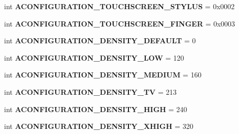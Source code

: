 \begin{DoxyCompactItemize}
int {\bfseries A\+C\+O\+N\+F\+I\+G\+U\+R\+A\+T\+I\+O\+N\+\_\+\+T\+O\+U\+C\+H\+S\+C\+R\+E\+E\+N\+\_\+\+S\+T\+Y\+L\+US} = 0x0002
\item 
\mbox{\label{classarsc_1_1external_1_1configuration_1_1AConfiguration_a693cd5bcf845730db0d1a15df39c61bb}} 
int {\bfseries A\+C\+O\+N\+F\+I\+G\+U\+R\+A\+T\+I\+O\+N\+\_\+\+T\+O\+U\+C\+H\+S\+C\+R\+E\+E\+N\+\_\+\+F\+I\+N\+G\+ER} = 0x0003
\item 
\mbox{\label{classarsc_1_1external_1_1configuration_1_1AConfiguration_a95cef07ba739b109cf6c2b8665bab27f}} 
int {\bfseries A\+C\+O\+N\+F\+I\+G\+U\+R\+A\+T\+I\+O\+N\+\_\+\+D\+E\+N\+S\+I\+T\+Y\+\_\+\+D\+E\+F\+A\+U\+LT} = 0
\item 
\mbox{\label{classarsc_1_1external_1_1configuration_1_1AConfiguration_a8ac42547b7b2555ca20491807ee42c31}} 
int {\bfseries A\+C\+O\+N\+F\+I\+G\+U\+R\+A\+T\+I\+O\+N\+\_\+\+D\+E\+N\+S\+I\+T\+Y\+\_\+\+L\+OW} = 120
\item 
\mbox{\label{classarsc_1_1external_1_1configuration_1_1AConfiguration_ad3501bab2a97d75235ce693380ef8b6d}} 
int {\bfseries A\+C\+O\+N\+F\+I\+G\+U\+R\+A\+T\+I\+O\+N\+\_\+\+D\+E\+N\+S\+I\+T\+Y\+\_\+\+M\+E\+D\+I\+UM} = 160
\item 
\mbox{\label{classarsc_1_1external_1_1configuration_1_1AConfiguration_ad843d4beecc740a8a02f78be0dbe9945}} 
int {\bfseries A\+C\+O\+N\+F\+I\+G\+U\+R\+A\+T\+I\+O\+N\+\_\+\+D\+E\+N\+S\+I\+T\+Y\+\_\+\+TV} = 213
\item 
\mbox{\label{classarsc_1_1external_1_1configuration_1_1AConfiguration_a70a96faf0e512bdee2270936af770e0b}} 
int {\bfseries A\+C\+O\+N\+F\+I\+G\+U\+R\+A\+T\+I\+O\+N\+\_\+\+D\+E\+N\+S\+I\+T\+Y\+\_\+\+H\+I\+GH} = 240
\item 
\mbox{\label{classarsc_1_1external_1_1configuration_1_1AConfiguration_abc197548e39f16903c3712071f0f5846}} 
int {\bfseries A\+C\+O\+N\+F\+I\+G\+U\+R\+A\+T\+I\+O\+N\+\_\+\+D\+E\+N\+S\+I\+T\+Y\+\_\+\+X\+H\+I\+GH} = 320

\end{DoxyCompactItemize}
